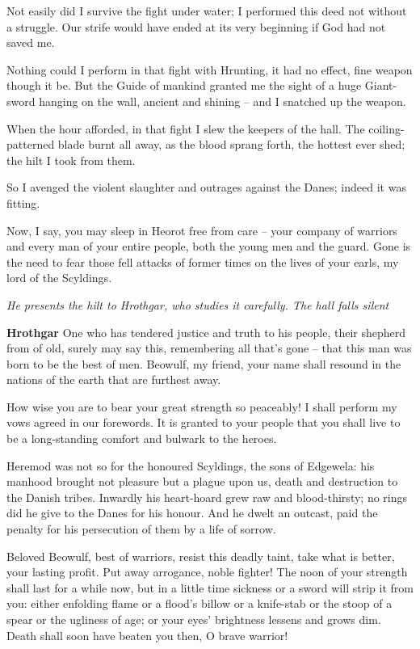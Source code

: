 \documentclass[a4paper]{article}
\begin{document}
{Not easily did I survive
the fight under water; I performed this deed
not without a struggle. Our strife would have ended
at its very beginning if God had not saved me.

Nothing could I perform in that fight with Hrunting,
it had no effect, fine weapon though it be.
But the Guide of mankind granted me the sight
of a huge Giant-sword hanging on the wall,
ancient and shining – and I snatched up the weapon.

When the hour afforded, in that fight I slew
the keepers of the hall. The coiling-patterned
blade burnt all away, as the blood sprang forth,
the hottest ever shed; the hilt I took from them.

So I avenged the violent slaughter
and outrages against the Danes; indeed it was fitting.

Now, I say, you may sleep in Heorot
free from care – your company of warriors
and every man of your entire people,
both the young men and the guard. Gone is the need
to fear those fell attacks of former times
on the lives of your earls, my lord of the Scyldings.

\centerline{\textit{He presents the hilt to Hrothgar, who studies it carefully. The hall falls silent}}

\textbf{Hrothgar} One who has tendered justice and truth to his people,
their shepherd from of old, surely may say this,
remembering all that's gone – that this man was born
to be the best of men. Beowulf, my friend,
your name shall resound in the nations of the earth
that are furthest away.

How wise you are to bear
your great strength so peaceably! I shall perform my vows
agreed in our forewords. It is granted to your people
that you shall live to be a long-standing comfort
and bulwark to the heroes.

Heremod was not so
for the honoured Scyldings, the sons of Edgewela:
his manhood brought not pleasure but a plague upon us,
death and destruction to the Danish tribes.
Inwardly his heart-hoard
grew raw and blood-thirsty; no rings did he give
to the Danes for his honour. And he dwelt an outcast,
paid the penalty for his persecution of them
by a life of sorrow. 

Beloved Beowulf, best of warriors,
resist this deadly taint, take what is better,
your lasting profit. Put away arrogance,
noble fighter! The noon of your strength
shall last for a while now, but in a little time
sickness or a sword will strip it from you:
either enfolding flame or a flood's billow
or a knife-stab or the stoop of a spear
or the ugliness of age; or your eyes' brightness
lessens and grows dim. Death shall soon
have beaten you then, O brave warrior!

}
\end{document}
